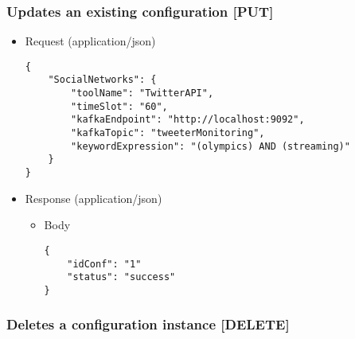 \subsubsection{Updates an existing configuration
{[}PUT{]}}\label{updates-an-existing-configuration-put}

\begin{itemize}
\item
  Request (application/json)

\begin{verbatim}
{
    "SocialNetworks": {
        "toolName": "TwitterAPI",
        "timeSlot": "60",
        "kafkaEndpoint": "http://localhost:9092",
        "kafkaTopic": "tweeterMonitoring",
        "keywordExpression": "(olympics) AND (streaming)"
    }
}
\end{verbatim}
\item
  Response (application/json)

  \begin{itemize}
  \item
    Body

\begin{verbatim}
{
    "idConf": "1"
    "status": "success"
}
\end{verbatim}
  \end{itemize}
\end{itemize}

\subsubsection{Deletes a configuration instance
{[}DELETE{]}}\label{deletes-a-configuration-instance-delete}
